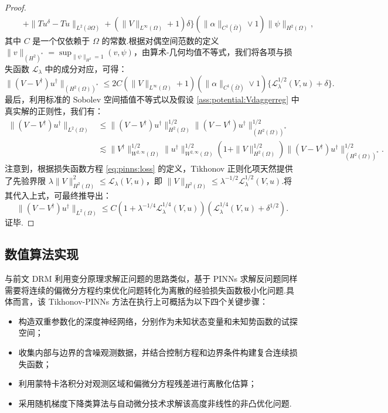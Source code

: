 \begin{proof}
\begin{align*}
&\quad+ \|Tu^{\delta}-Tu\|_{L^{2}(\partial\Omega)} + (\|V\|_{L^{\infty}(\Omega)}+1)\delta \Big\} (\|\alpha\|_{C^{1}(\bar{\Omega})}\vee 1) \|\psi\|_{H^{2}(\Omega)},
\end{align*}
其中 $C$ 是一个仅依赖于 $\Omega$ 的常数.根据对偶空间范数的定义 $\|v\|_{(H^2)^*} = \sup_{\|\psi\|_{H^2}=1} (v,\psi)$，由算术-几何均值不等式，我们将各项与损失函数 $\mathcal{L}_{\lambda}$ 中的成分对应，可得：
\begin{equation}
\|(V-V^{\dagger})u^{\dagger}\|_{(H^{2}(\Omega))^{*}} \leq 2C(\|V\|_{L^{\infty}(\Omega)}+1)(\|\alpha\|_{C^{1}(\bar{\Omega})}\vee 1)\Big\{ \mathcal{L}_{\lambda}^{1/2}(V,u)+\delta \Big\}.
\end{equation}
最后，利用标准的 Sobolev 空间插值不等式以及假设 \ref{ass:potential:Vdaggerreg} 中真实解的正则性，我们有：
\begin{align*}
\|(V-V^{\dagger})u^{\dagger}\|_{L^{2}(\Omega)} &\leq \|(V-V^{\dagger})u^{\dagger}\|_{H^{2}(\Omega)}^{1/2} \|(V-V^{\dagger})u^{\dagger}\|_{(H^{2}(\Omega))^{*}}^{1/2} \\
&\lesssim \|V^{\dagger}\|_{W^{2,\infty}(\Omega)}^{1/2} \|u^{\dagger}\|_{W^{2,\infty}(\Omega)}^{1/2} \left(1+\|V\|_{H^{2}(\Omega)}^{1/2}\right) \|(V-V^{\dagger})u^{\dagger}\|_{(H^{2}(\Omega))^{*}}^{1/2}.
\end{align*}
注意到，根据损失函数方程 \eqref{eq:pinns:loss} 的定义，Tikhonov 正则化项天然提供了先验界限 $\lambda\|V\|_{H^{2}(\Omega)}^{2} \leq \mathcal{L}_{\lambda}(V,u)$，即 $\|V\|_{H^{2}(\Omega)} \leq \lambda^{-1/2}\mathcal{L}_{\lambda}^{1/2}(V,u)$.将其代入上式，可最终推导出：
\begin{equation*}
\|(V-V^{\dagger})u^{\dagger}\|_{L^{2}(\Omega)} \leq C\left(1+\lambda^{-1/4}\mathcal{L}_{\lambda}^{1/4}(V,u)\right)\left(\mathcal{L}_{\lambda}^{1/4}(V,u)+\delta^{1/2}\right).
\end{equation*}
证毕.
\end{proof}

\subsection{数值算法实现}
与前文 DRM 利用变分原理求解正问题的思路类似，基于 PINNs 求解反问题同样需要将连续的偏微分方程约束优化问题转化为离散的经验损失函数极小化问题.具体而言，该 Tikhonov-PINNs 方法在执行上可概括为以下四个关键步骤：

\begin{itemize}
    \item 构造双重参数化的深度神经网络，分别作为未知状态变量和未知势函数的试探空间；
    \item 收集内部与边界的含噪观测数据，并结合控制方程和边界条件构建复合连续损失函数；
    \item 利用蒙特卡洛积分对观测区域和偏微分方程残差进行离散化估算；
    \item 采用随机梯度下降类算法与自动微分技术求解该高度非线性的非凸优化问题.
\end{itemize}

